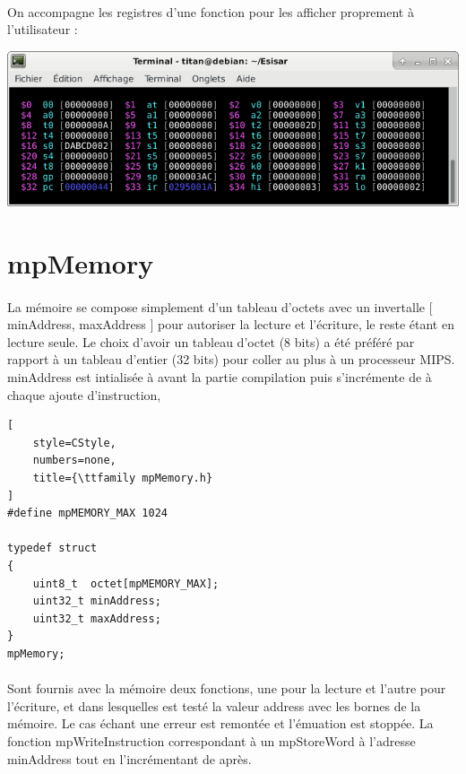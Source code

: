 \documentclass[12pt]{report} %
\begin{document}
\paragraph{}
On accompagne les registres d'une fonction pour les afficher proprement à l'utilisateur :

\begin{center}
    \includegraphics[width=\textwidth]{MIPS-mpRegister.png}
\end{center}

\section{mpMemory}

\paragraph{}
La mémoire se compose simplement d'un tableau d'octets avec un invertalle [ {\ttfamily minAddress}, {\ttfamily maxAddress} ] pour autoriser la lecture et l'écriture, le reste étant en lecture seule. Le choix d'avoir un tableau d'octet (8 bits) a été préféré par rapport à un tableau d'entier (32 bits) pour coller au plus à un processeur {\ttfamily MIPS}. {\ttfamily minAddress} est intialisée à {} avant la partie compilation puis s'incrémente de {} à chaque ajoute d'instruction,

\begin{lstlisting}[
    style=CStyle,
    numbers=none,
    title={\ttfamily mpMemory.h}
]
#define mpMEMORY_MAX 1024

typedef struct
{
    uint8_t  octet[mpMEMORY_MAX];
    uint32_t minAddress;
    uint32_t maxAddress;
}
mpMemory;
\end{lstlisting}

\paragraph{}
Sont fournis avec la mémoire deux fonctions, une pour la lecture et l'autre pour l'écriture, et dans lesquelles est testé la valeur {\ttfamily address} avec les bornes de la mémoire. Le cas échant une erreur est remontée et l'émuation est stoppée. La fonction {\ttfamily mpWriteInstruction} correspondant à un {\ttfamily mpStoreWord} à l'adresse {\ttfamily minAddress} tout en l'incrémentant de {} après.
\end{document}
